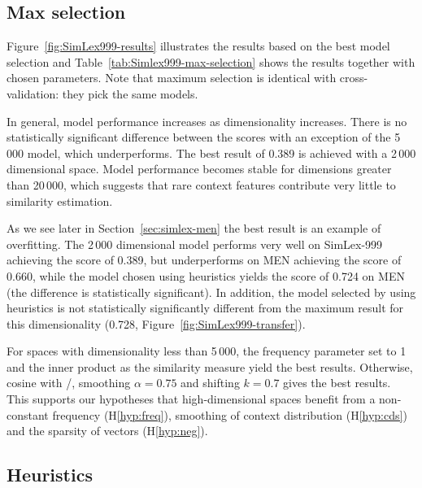 \subsection{Max selection}
\label{sec:max-selection-simlex}



Figure~\ref{fig:SimLex999-results} illustrates the results based on the best model selection and Table~\ref{tab:Simlex999-max-selection} shows the results together with chosen parameters. Note that maximum selection is identical with cross-validation: they pick the same models.

In general, model performance increases as dimensionality increases. There is no statistically significant difference between the scores with an
exception of the 5\,000 model, which underperforms. The best result of 0.389 is achieved with a 2\,000 dimensional space. Model performance becomes stable for dimensions greater than 20\,000, which suggests that rare context features contribute very little to similarity estimation.



As we see later in Section~\ref{sec:simlex-men} the best result is an example of
overfitting. The 2\,000 dimensional model performs very well on SimLex-999
achieving the score of 0.389, but underperforms on MEN achieving the score of
0.660, while the model chosen using heuristics yields the score of 0.724 on MEN
(the difference is statistically significant). In addition, the model selected
by using heuristics is not statistically significantly different from the maximum result for this dimensionality (0.728, Figure~\ref{fig:SimLex999-transfer}).

For spaces with dimensionality less than 5\,000, the frequency parameter set to 1 and the inner product as the similarity measure yield the best results. Otherwise, cosine with \logNSCPMI/, smoothing $\alpha=0.75$ and shifting $k=0.7$ gives the best results. This supports our hypotheses that high-dimensional spaces benefit from a non-constant frequency (H\ref{hyp:freq}), smoothing of context distribution (H\ref{hyp:cds}) and the sparsity of vectors (H\ref{hyp:neg}).

\subsection{Heuristics}
\label{sec:heuristics-simlex}

% 

